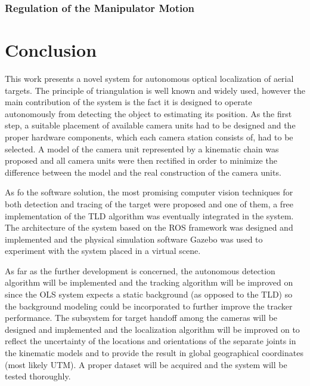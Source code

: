 	\subsection{Regulation of the Manipulator Motion} \label{txt:test_regulation}
	
	\vata[28]
	
	\chapter{Conclusion} \label{txt:conclusion}
	
	
	
	This work presents a novel system for autonomous optical localization of aerial targets. The principle of triangulation is well known and widely used, however the main contribution of the system is the fact it is designed to operate autonomously from detecting the object to estimating its position. As the first step, a suitable placement of available camera units had to be designed and the proper hardware components, which each camera station consists of, had to be selected. A model of the camera unit represented by a kinematic chain was proposed and all camera units were then rectified in order to minimize the difference between the model and the real construction of the camera units.
	
	As fo the software solution, the most promising computer vision techniques for both detection and tracing of the target were proposed and one of them, a free implementation of the TLD algorithm was eventually integrated in the system. The architecture of the system based on the ROS framework was designed and implemented and the physical simulation software Gazebo was used to experiment with the system placed in a virtual scene.
	
	As far as the further development is concerned, the autonomous detection algorithm will be implemented and the tracking algorithm will be improved on since the OLS system expects a static background (as opposed to the TLD) so the background modeling could be incorporated to further improve the tracker performance. The subsystem for target handoff among the cameras will be designed and implemented and the localization algorithm will be improved on to reflect the uncertainty of the locations and orientations of the separate joints in the kinematic models and to provide the result in global geographical coordinates (most likely UTM). A proper dataset will be acquired and the system will be tested thoroughly.
	
	\vata[5]
